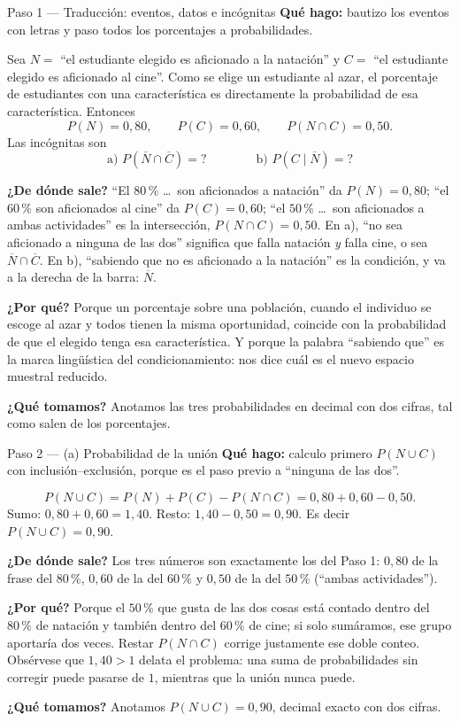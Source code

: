 \documentclass[11pt]{article}
\begin{document}
\begin{paso}{Paso 1 --- Traducción: eventos, datos e incógnitas}
\textbf{Qué hago:} bautizo los eventos con letras y paso todos los porcentajes a probabilidades.

Sea $N=$ ``el estudiante elegido es aficionado a la natación'' y $C=$ ``el estudiante elegido es aficionado al cine''. Como se elige un estudiante al azar, el porcentaje de estudiantes con una característica es directamente la probabilidad de esa característica. Entonces
\[
P(N)=0{,}80,\qquad P(C)=0{,}60,\qquad P(N\cap C)=0{,}50.
\]
Las incógnitas son
\[
\text{a) } P(\overline{N}\cap\overline{C})=?
\qquad\qquad
\text{b) } P(C\mid \overline{N})=?
\]

\textbf{¿De dónde sale?} ``El $80\,\%$ \dots\ son aficionados a natación'' da $P(N)=0{,}80$; ``el $60\,\%$ son aficionados al cine'' da $P(C)=0{,}60$; ``el $50\,\%$ \dots\ son aficionados a ambas actividades'' es la intersección, $P(N\cap C)=0{,}50$. En a), ``no sea aficionado a ninguna de las dos'' significa que falla natación \emph{y} falla cine, o sea $\overline{N}\cap\overline{C}$. En b), ``sabiendo que no es aficionado a la natación'' es la condición, y va a la derecha de la barra: $\overline{N}$.

\textbf{¿Por qué?} Porque un porcentaje sobre una población, cuando el individuo se escoge al azar y todos tienen la misma oportunidad, coincide con la probabilidad de que el elegido tenga esa característica. Y porque la palabra ``sabiendo que'' es la marca lingüística del condicionamiento: nos dice cuál es el nuevo espacio muestral reducido.

\textbf{¿Qué tomamos?} Anotamos las tres probabilidades en decimal con dos cifras, tal como salen de los porcentajes.
\end{paso}

\begin{paso}{Paso 2 --- (a) Probabilidad de la unión}
\textbf{Qué hago:} calculo primero $P(N\cup C)$ con inclusión--exclusión, porque es el paso previo a ``ninguna de las dos''.

\[
P(N\cup C)=P(N)+P(C)-P(N\cap C)=0{,}80+0{,}60-0{,}50.
\]
Sumo: $0{,}80+0{,}60=1{,}40$. Resto: $1{,}40-0{,}50=0{,}90$. Es decir $P(N\cup C)=0{,}90$.

\textbf{¿De dónde sale?} Los tres números son exactamente los del Paso 1: $0{,}80$ de la frase del $80\,\%$, $0{,}60$ de la del $60\,\%$ y $0{,}50$ de la del $50\,\%$ (``ambas actividades'').

\textbf{¿Por qué?} Porque el $50\,\%$ que gusta de las dos cosas está contado dentro del $80\,\%$ de natación y también dentro del $60\,\%$ de cine; si solo sumáramos, ese grupo aportaría dos veces. Restar $P(N\cap C)$ corrige justamente ese doble conteo. Obsérvese que $1{,}40>1$ delata el problema: una suma de probabilidades sin corregir puede pasarse de $1$, mientras que la unión nunca puede.

\textbf{¿Qué tomamos?} Anotamos $P(N\cup C)=0{,}90$, decimal exacto con dos cifras.
\end{paso}
\end{document}
